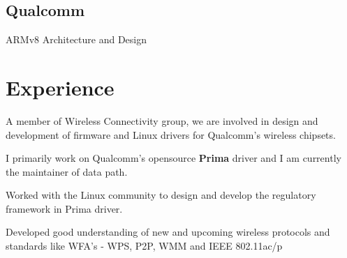 \documentclass[letterpaper]{deedy-resume} %
\begin{document}
\begin{minipage}[t]{0.33\textwidth}
\subsection{Qualcomm}
\textbullet{} ARMv8 Architecture and Design \\
\sectionspace %



\end{minipage} %
\hfill
%
%
\begin{minipage}[t]{0.66\textwidth} %


\section{Experience}


\vspace{\topsep} %
\begin{tightitemize}
\item A member of Wireless Connectivity group, we are involved in design and development of firmware and Linux drivers for Qualcomm's wireless chipsets.
\item I primarily work on  Qualcomm's opensource \textbf{Prima} driver and I am currently the maintainer of data path.
\item Worked with the Linux community to design and develop the regulatory framework in Prima driver.
\item Developed good understanding of new and upcoming wireless protocols and standards like WFA's - WPS, P2P, WMM and IEEE 802.11ac/p
\end{tightitemize}

\sectionspace %




\end{minipage}
\end{document}
